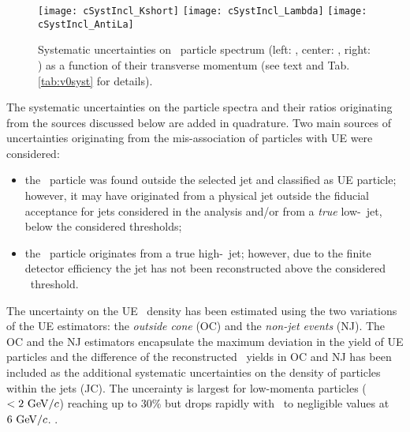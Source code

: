 \begin{figure}[htbp]
	\centering
	\texttt{[image: cSystIncl\_Kshort]}
	\texttt{[image: cSystIncl\_Lambda]}
	\texttt{[image: cSystIncl\_AntiLa]}
	\caption{Systematic uncertainties on \Vzero\ particle spectrum (left: \ks, center: \lda, right: \alda) as a function of their transverse momentum (see text and Tab. \ref{tab:v0syst} for details).}
	\label{fig:systUncert}
\end{figure}




The systematic uncertainties on the particle spectra and their ratios originating from the sources discussed below are added in quadrature. 
Two main sources of uncertainties originating from the mis-association of \Vzero particles with UE were considered:
\begin{itemize}
\item the \Vzero\ particle was found outside the selected jet and classified as UE particle; however, it may have originated from a physical jet outside the fiducial acceptance for jets considered in the analysis and/or from a {\it true} low-\pt\ jet, below the considered thresholds;
\item the \Vzero\ particle originates from a true high-\pt\ jet; however, due to the finite detector efficiency the jet has not been reconstructed above the considered \pt\ threshold.
\end{itemize}

The uncertainty on the UE \Vzero\ density has been estimated using the two variations of the UE estimators: the {\it outside cone} (OC) and the {\it non-jet events} (NJ).
The OC and the NJ estimators encapsulate the maximum deviation in the yield of UE particles and the difference of the reconstructed \Vzero\ yields in OC and NJ has been included as the additional systematic uncertainties on the density of particles within the jets (JC). 
The uncerainty is largest for low-momenta particles ($< 2~\mathrm{GeV}/c$) reaching up to 30\% but drops rapidly with \pt\ to negligible values at $6~\mathrm{GeV}/c$. .


